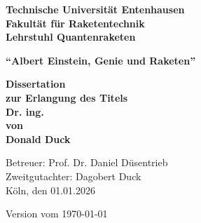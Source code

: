 \begin{titlepage}
{\bfseries\Large Technische Universität Entenhausen \\ Fakultät für Raketentechnik \\ Lehrstuhl Quantenraketen}\vspace*{3cm}

\begin{center}
\LARGE\bfseries\enquote{Albert Einstein, Genie und Raketen}
\end{center}\vspace*{2cm}

\begin{center}
\LARGE\bfseries Dissertation\\ zur Erlangung des Titels\\ Dr. ing. \\ von \\ Donald Duck
\end{center}



\vfill %
{\large Betreuer: Prof. Dr. Daniel Düsentrieb \\ 
Zweitgutachter: Dagobert Duck \\
Köln, den 01.01.2026}

\hfill Version vom \today
\end{titlepage}